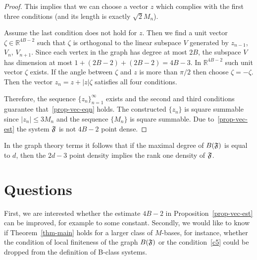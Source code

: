 \documentclass[12pt,oneside,a4paper]{amsart}
\begin{document}
\begin{proof}
        This implies that we can choose a vector $z$ which complies with the first three conditions (and its length is exactly $\sqrt{2}M_n$).

        Assume the last condition does not hold for $z$.
        Then we find a unit vector $\zeta \in \mathbb{R}^{4B - 2}$ such that $\zeta$ is orthogonal to the linear subspace $V$ generated by
          $z_{n-1}$, $V_{n}$, $V_{n + 1}$.
        Since each vertex in the graph has degree at most $2B$, the subspace $V$ has dimension at most $1 + (2B - 2) + (2B - 2) = 4B - 3$.
        In $\mathbb{R}^{4B-2}$ such unit vector $\zeta$ exists.
        If the angle between $\zeta$ and $z$ is more than $\pi/2$ then choose $\zeta = -\zeta$.
        Then the vector $z_n = z + \lvert z \rvert \zeta$ satisfies all four conditions.

        Therefore, the sequence $\{z_n\}_{n=1}^\infty$ exists and the second and third conditions guarantee that~\eqref{prop-vec-eqn} holds.
        The constructed $\{z_n\}$ is square summable since $\lvert z_n \rvert \leq 3M_n$ and the sequence $\{M_n\}$ is square summable.
        Due to~\eqref{prop-vec-est} the system $\mathfrak{F}$ is not $4B - 2$ point dense.
      \end{proof}
      \begin{remark*}
        In the graph theory terms it follows that if the maximal degree of $B(\mathfrak{F})$ is equal to $d$,
          then the $2d - 3$ point density implies the rank one density of $\mathfrak{F}$.
      \end{remark*}
  \bigskip
  \section{Questions}
    First, we are interested whether the estimate $4B - 2$ in Proposition~\eqref{prop-vec-est} can be improved, for example to some constant.
    Secondly, we would like to know if Theorem~\ref{thm-main} holds for a larger class of $M$-bases, for instance, whether the condition of
      local finiteness of the graph $B(\mathfrak{F})$ or the condition~\ref{c5} could be dropped from the definition of B-class systems.
\end{document}
